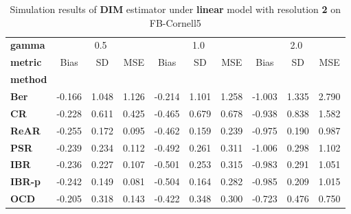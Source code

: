 \begin{table}
\centering
\caption{Simulation results of \textbf{DIM} estimator under \textbf{linear} model with resolution \textbf{2} on FB-Cornell5}
\begin{tabular}{lccccccccc}
\toprule
\textbf{gamma} & \multicolumn{3}{c}{0.5} & \multicolumn{3}{c}{1.0} & \multicolumn{3}{c}{2.0} \\
\textbf{metric} &   Bias &     SD &    MSE &   Bias &     SD &    MSE &   Bias &     SD &    MSE \\
\textbf{method} &        &        &        &        &        &        &        &        &        \\
\midrule
\textbf{Ber} & -0.166 &  1.048 &  1.126 & -0.214 &  1.101 &  1.258 & -1.003 &  1.335 &  2.790 \\
\textbf{CR} & -0.228 &  0.611 &  0.425 & -0.465 &  0.679 &  0.678 & -0.938 &  0.838 &  1.582 \\
\textbf{ReAR} & -0.255 &  0.172 &  0.095 & -0.462 &  0.159 &  0.239 & -0.975 &  0.190 &  0.987 \\
\textbf{PSR} & -0.239 &  0.234 &  0.112 & -0.492 &  0.261 &  0.311 & -1.006 &  0.298 &  1.102 \\
\textbf{IBR} & -0.236 &  0.227 &  0.107 & -0.501 &  0.253 &  0.315 & -0.983 &  0.291 &  1.051 \\
\textbf{IBR-p} & -0.242 &  0.149 &  0.081 & -0.504 &  0.164 &  0.282 & -0.985 &  0.209 &  1.015 \\
\textbf{OCD} & -0.205 &  0.318 &  0.143 & -0.422 &  0.348 &  0.300 & -0.723 &  0.476 &  0.750 \\
\bottomrule
\end{tabular}
\end{table}
